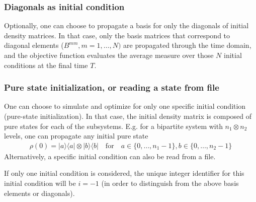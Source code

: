 \documentclass[letterpaper]{article}
\DeclareMathOperator{\Tr}{Tr}
\begin{document}
\subsubsection{Diagonals as initial condition}
Optionally, one can choose to propagate a basis for only the diagonals of
initial density matrices. In that case, only the basis matrices that correspond
to diagonal elements ($B^{mm}, m=1,\dots,N)$ are propagated through the time
domain, and the objective function evaluates the average measure over those $N$
initial conditions at the final time $T$. 

\subsubsection{Pure state initialization, or reading a state from file}
One can choose to simulate and optimize for only one specific initial condition (pure-state initialization). In that case, the initial density matrix is composed
of pure states for each of the subsystems. E.g. for a bipartite system with $n_1
\otimes n_2$ levels, one can propagate any initial pure state 
\begin{align}
  \rho(0)  = |a\rangle \langle a| \otimes |b\rangle \langle b| \quad \text{for} \quad a \in \{0,\dots, n_1-1\}, b\in \{0,\dots, n_2-1\}
\end{align}
Alternatively, a specific initial condition can also be read from a file. 

If only one initial condition is considered, the unique integer identifier for
this initial condition will be $i=-1$ (in order to distinguish from the above
basis elements or diagonals).

\end{document}
